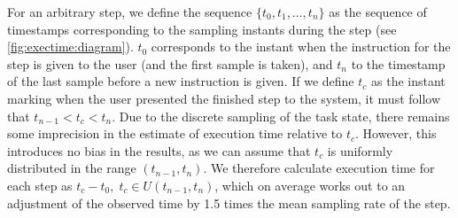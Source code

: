\documentclass[10pt,letterpaper]{article}
\begin{document}
For an arbitrary step, we define the sequence \( \{ t_{0}, t_{1}, \ldots, t_{n} \} \) as the sequence of timestamps corresponding to the sampling instants during the step (see \cref{fig:exectime:diagram}).
\( t_{0} \) corresponds to the instant when the instruction for the step is given to the user (and the first sample is taken), and \( t_{n} \) to the timestamp of the last sample before a new instruction is given.
If we define \( t_{c} \) as the instant marking when the user presented the finished step to the system, it must follow that \( t_{n-1} < t_{c} < t_{n} \).
Due to the discrete sampling of the task state, there remains some imprecision in the estimate of execution time relative to \( t_{c} \).
However, this introduces no bias in the results, as we can assume that \( t_{c} \) is uniformly distributed in the range \( (t_{n-1}, t_{n}) \).
We therefore calculate execution time for each step as \( t_{c} - t_{0},\; t_{c} \in U(t_{n-1}, t_{n}) \), which on average works out to an adjustment of the observed time by 1.5 times the mean sampling rate of the step.


\end{document}

